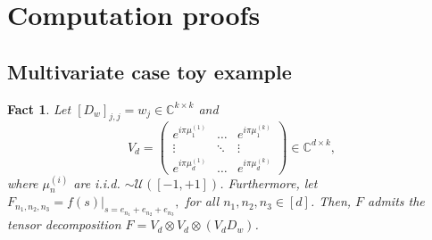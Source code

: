 \documentclass[11pt]{article}
\newtheorem{fact}[theorem]{Fact}
\begin{document}
\section{Computation proofs}
\subsection{Multivariate case toy example}
\begin{fact}
    Let $[D_w]_{j,j}=w_j\in\mathbb{C}^{k\times k}$ and $$V_d=
    \begin{pmatrix}
        e^{i\pi\mu_1^{(1)}}&\ldots&e^{i\pi\mu_1^{(k)}}\\
        \vdots&\ddots&\vdots\\
        e^{i\pi\mu_d^{(1)}}&\ldots&e^{i\pi\mu_d^{(k)}}
    \end{pmatrix}\in\mathbb{C}^{d\times k},$$ where $\mu_n^{(i)}$ are i.i.d. $\sim\mathcal{U}([-1,+1])$. Furthermore, let $F_{n_1,n_2,n_3}=f(s)\big|_{s=e_{n_1}+e_{n_2}+e_{n_3}},$ for all $n_1,n_2,n_3\in[d]$. Then, $F$ admits the tensor decomposition $F=V_d\otimes V_d\otimes(V_dD_w)$.
\end{fact}
\end{document}
